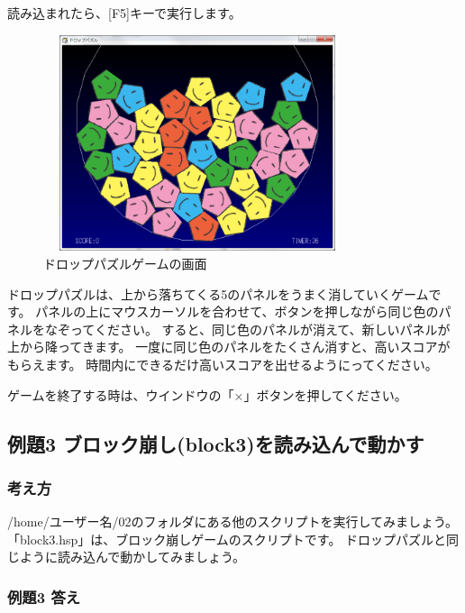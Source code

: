 \noindent
読み込まれたら、[F5]キーで実行します。

\begin{figure}[H]
  \begin{center}
    \includegraphics[keepaspectratio,width=9.049cm,height=6.346cm]{images/chap02/text02-img015.png}
    \caption{ドロップパズルゲームの画面}
  \end{center}
  \label{fig:drop_display}
\end{figure}

ドロップパズルは、上から落ちてくる5のパネルをうまく消していくゲームです。
パネルの上にマウスカーソルを合わせて、ボタンを押しながら同じ色のパネルをなぞってください。
すると、同じ色のパネルが消えて、新しいパネルが上から降ってきます。
一度に同じ色のパネルをたくさん消すと、高いスコアがもらえます。
時間内にできるだけ高いスコアを出せるようにってください。

ゲームを終了する時は、ウインドウの「×」ボタンを押してください。
\clearpage

% 
% 
% 
\subsection{例題3 ブロック崩し(block3)を読み込んで動かす}

\subsubsection*{考え方}

/home/ユーザー名/02のフォルダにある他のスクリプトを実行してみましょう。
「block3.hsp」は、ブロック崩しゲームのスクリプトです。
ドロップパズルと同じように読み込んで動かしてみましょう。

\subsubsection*{例題3 答え}

